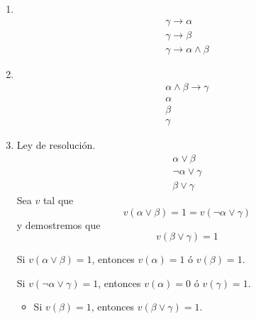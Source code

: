 \begin{ejercicio*}
\begin{enumerate}
    \item \ 
        \begin{equation*}
            \begin{array}{c}
                \gamma\rightarrow\alpha \\
                \gamma \rightarrow\beta \\
                \hline
                \gamma\rightarrow\alpha\land\beta
            \end{array}
        \end{equation*}

    \item \ 
        \begin{equation*}
            \begin{array}{c}
                \alpha\land\beta\rightarrow\gamma \\
                \alpha \\
                \beta \\
                \hline
                \gamma
            \end{array}
        \end{equation*}

    \item Ley de resolución.
        \begin{equation*}
            \begin{array}{c}
                \alpha\lor\beta \\
                \lnot\alpha\lor\gamma \\
                \hline
                \beta\lor\gamma
            \end{array}
        \end{equation*}
        Sea $v$ tal que 
        \begin{equation*}
            v(\alpha\lor\beta) = 1 = v(\lnot\alpha\lor\gamma)
        \end{equation*}
        y demostremos que
        \begin{equation*}
            v(\beta\lor\gamma) = 1
        \end{equation*}

        Si $v(\alpha\lor\beta)=1$, entonces $v(\alpha)=1$ ó $v(\beta)=1$. 

        Si $v(\lnot\alpha\lor\gamma)=1$, entonces $v(\alpha)=0$ ó $v(\gamma)=1$.\\

        \begin{itemize}
            \item Si $v(\beta)=1$, entonces $v(\beta\lor\gamma)=1$. 


\end{itemize}
\end{enumerate}
\end{ejercicio*}
